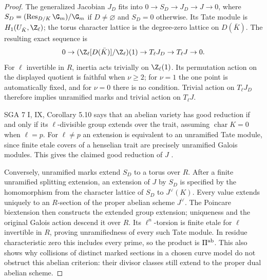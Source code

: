 \begin{proof}
The generalized Jacobian $J_D$ fits into $0\to S_D\to J_D\to J\to0$,
where $S_D=(\operatorname{Res}_{D/K}\G_m)/\G_m$ if $D\ne\varnothing$ and
$S_D=0$ otherwise. Its Tate module is $H_1(U_{\bar K},\Z_\ell)$; the
torus character lattice is the degree-zero lattice on $D(\bar K)$.
The resulting exact sequence is
\[
0\to(\Z_\ell[D(\bar K)]/\Z_\ell)(1)\to T_\ell J_D
\to T_\ell J\to0.
\]
For $\ell$ invertible in $R$, inertia acts trivially on $\Z_\ell(1)$.
Its permutation action on the displayed quotient is faithful when
$\nu\ge2$; for $\nu=1$ the one point is automatically fixed, and for
$\nu=0$ there is no condition. Trivial action on $T_\ell J_D$ therefore
implies unramified marks and trivial action on $T_\ell J$.

SGA 7 I, IX, Corollary 5.10 says that an abelian variety has good reduction
if and only if its $\ell$-divisible group extends over the trait, assuming
$\operatorname{char}K=0$ when $\ell=p$. For $\ell\ne p$ an extension is
equivalent to an unramified Tate module, since finite etale covers of a
henselian trait are precisely unramified Galois modules. This gives the
claimed good reduction of $J$ \citep[IX, Corollary 5.10 and
Proposition 5.13(a)]{BC_SGA7}.

Conversely, unramified marks extend $S_D$ to a torus over $R$. After a finite
unramified splitting extension, an extension of $J$ by $S_D$ is specified
by the homomorphism from the character lattice of $S_D$ to $J^\vee(K)$.
Every value extends uniquely to an $R$-section of the proper abelian scheme
$J^\vee$. The Poincare biextension then constructs the extended group
extension; uniqueness and the original Galois action descend it over $R$.
Its $\ell^n$-torsion is finite etale for $\ell$ invertible in $R$, proving
unramifiedness of every such Tate module. In residue characteristic zero
this includes every prime, so the product is $\Pi^{\rm ab}$. This also
shows why collisions of distinct marked sections in a chosen curve model
do not obstruct this abelian criterion: their divisor classes still extend
to the proper dual abelian scheme.
\end{proof}

